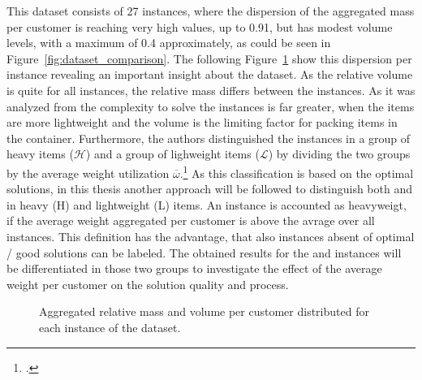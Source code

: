 This dataset consists of 27 instances, where the dispersion of the aggregated mass per customer is reaching very high values, up to
0.91, but has modest volume levels, with a maximum of 0.4 approximately, as could be seen in Figure~\ref{fig:dataset_comparison}. The
following Figure~\ref{fig:aggregated_gendreau_plots} show this dispersion per instance revealing an important insight about the dataset.
As the relative volume is quite for all instances, the relative mass differs between the instances. As it was analyzed from \cite{tamke_branch-and-cut_2024}
the complexity to solve the instances is far greater, when the items are more lightweight and the volume is the limiting factor
for packing items in the container. Furthermore, the authors distinguished the instances in a group of heavy items ($\mathcal{H}$) and
a group of lighweight items ($\mathcal{L}$) by dividing the two groups by the average weight utilization $\overline{\omega}$.\footcite[cf.][pp. 23-25]{tamke_branch-and-cut_2024}
As this classification is based on the optimal solutions, in this thesis another approach will be followed to distinguish both
\krebsADataSetText and \gendreauDataSetText in heavy (H) and lightweight (L) items. An instance is accounted as heavyweigt, if
the average weight aggregated per customer is above the avrage over all instances. This definition has the advantage, that also instances absent
of optimal / good solutions can be labeled. The obtained results for the \gendreauDataSetText and \krebsADataSetText instances will be
differentiated in those two groups to investigate the effect of the average weight per customer on the solution quality and process.

\begin{figure}[ht]
    \centering
    \caption{Aggregated relative mass and volume per customer distributed for each instance of the \gendreauDataSetText dataset.}
    \label{fig:aggregated_gendreau_plots}
\end{figure}

